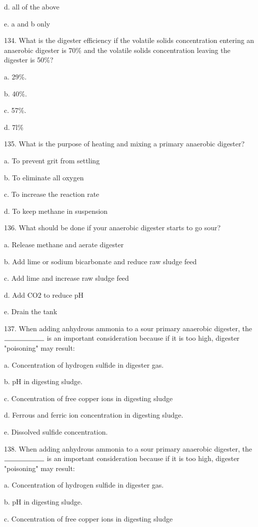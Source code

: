 \documentclass{article}
\begin{document}
d. all of the above 

e. a and b only 


134. What is the digester efficiency if the volatile solids concentration entering an anaerobic digester is 70\% and the volatile solids concentration leaving the digester is 50\%? 

a. 29\%. 

b. 40\%. 

c. 57\%. 

d. 7l\% 


135. What is the purpose of heating and mixing a primary anaerobic digester? 

a. To prevent grit from settling 

b. To eliminate all oxygen 

c. To increase the reaction rate 

d. To keep methane in suspension 


136. What should be done if your anaerobic digester starts to go sour? 

a. Release methane and aerate digester 

b. Add lime or sodium bicarbonate and reduce raw sludge feed 

c. Add lime and increase raw sludge feed 

d. Add CO2 to reduce pH 

e. Drain the tank 


137. When adding anhydrous ammonia to a sour primary anaerobic digester, the $\rule{2cm}{0.15mm}$ is an important consideration because if it is too high, digester "poisoning" may result: 

a. Concentration of hydrogen sulfide in digester gas. 

b. pH in digesting sludge. 

c. Concentration of free copper ions in digesting sludge 

d. Ferrous and ferric ion concentration in digesting sludge. 

e. Dissolved sulfide concentration. 


138. When adding anhydrous ammonia to a sour primary anaerobic digester, the $\rule{2cm}{0.15mm}$ is an important consideration because if it is too high, digester "poisoning" may result: 

a. Concentration of hydrogen sulfide in digester gas. 

b. pH in digesting sludge. 

c. Concentration of free copper ions in digesting sludge 
\end{document}
